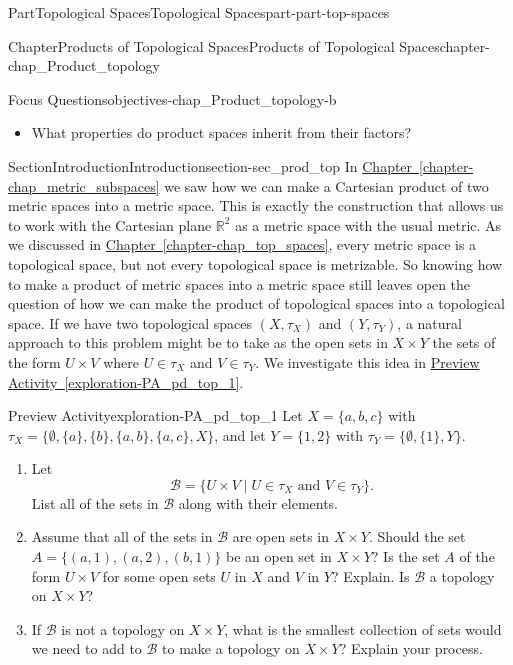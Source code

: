 \documentclass[oneside,10pt,]{book}
\newcommand{\xreffont}{\relax}
\numberwithin{equation}{chapter}
\newcommand{\R}{\mathbb{R}}
\newcommand{\CB}{\mathcal{B}}
\begin{document}
\begin{partptx}{Part}{Topological Spaces}{}{Topological Spaces}{}{}{part-part-top-spaces}
\begin{chapterptx}{Chapter}{Products of Topological Spaces}{}{Products of Topological Spaces}{}{}{chapter-chap_Product_topology}
\begin{objectives}{Focus Questions}{objectives-chap_Product_topology-b}
\begin{itemize}[label=\textbullet]
\item{}What properties do product spaces inherit from their factors?%
\end{itemize}
\end{objectives}
%
%
\typeout{************************************************}
\typeout{************************************************}
%
\begin{sectionptx}{Section}{Introduction}{}{Introduction}{}{}{section-sec_prod_top}
In \hyperref[chapter-chap_metric_subspaces]{Chapter~{\xreffont\ref{chapter-chap_metric_subspaces}}} we saw how we can make a Cartesian product of two metric spaces into a metric space. This is exactly the construction that allows us to work with the Cartesian plane \(\R^2\) as a metric space with the usual metric. As we discussed in \hyperref[chapter-chap_top_spaces]{Chapter~{\xreffont\ref{chapter-chap_top_spaces}}}, every metric space is a topological space, but not every topological space is metrizable. So knowing how to make a product of metric spaces into a metric space still leaves open the question of how we can make the product of topological spaces into a topological space. If we have two topological spaces \((X, \tau_X)\) and \((Y , \tau_Y)\), a natural approach to this problem might be to take as the open sets in \(X \times Y\) the sets of the form \(U \times V\) where \(U \in \tau_X\) and \(V \in \tau_Y\). We investigate this idea in \hyperref[exploration-PA_pd_top_1]{Preview Activity~{\xreffont\ref{exploration-PA_pd_top_1}}}.%
\begin{exploration}{Preview Activity}{}{exploration-PA_pd_top_1}%
Let \(X = \{a,b,c\}\) with \(\tau_X = \{\emptyset, \{a\}, \{b\}, \{a,b\}, \{a,c\}, X\}\), and let \(Y = \{1,2\}\) with \(\tau_Y = \{\emptyset, \{1\}, Y\}\).%
\begin{enumerate}[font=\bfseries,label=(\alph*),ref=\alph*]%
\item{}Let%
\begin{equation}
\CB = \{U \times V \mid U \in \tau_X \text{ and }  V \in \tau_Y\}\text{.}\label{men-eq_prod_basis}
\end{equation}
List all of the sets in \(\CB\) along with their elements.%
\item{}Assume that all of the sets in \(\CB\) are open sets in \(X \times Y\). Should the set \(A = \{(a,1), (a,2), (b,1)\}\) be an open set in \(X \times Y\)? Is the set \(A\) of the form \(U \times V\) for some open sets \(U\) in \(X\) and \(V\) in \(Y\)? Explain. Is \(\CB\) a topology on \(X \times Y\)?%
\item{}If \(\CB\) is not a topology on \(X \times Y\), what is the smallest collection of sets would we need to add to \(\CB\) to make a topology on \(X \times Y\)? Explain your process.%

\end{enumerate}
\end{exploration}
\end{sectionptx}
\end{chapterptx}
\end{partptx}
\end{document}
